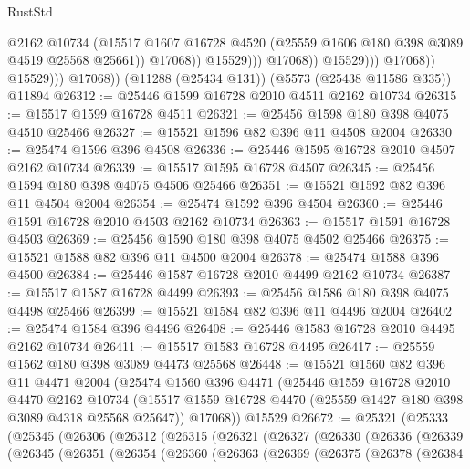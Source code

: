 \begin{lexlean}{RustStd}
\begin{coremodule}
                                      @2162
                                      @10734
                                      (@15517
                                        @1607
                                        @16728
                                        @4520
                                        (@25559 @1606 @180 @398 @3089 @4519 @25568 @25661))
                                      @17068))
                                  @15529)))
                            @17068))
                        @15529)))
                  @17068))
              @15529)))
        @17068))
    (@11288 (@25434 @131))
    (@5573 (@25438 @11586 @335))
    @11894
@26312 := @25446 @1599 @16728 @2010 @4511 @2162 @10734
@26315 := @15517 @1599 @16728 @4511
@26321 := @25456 @1598 @180 @398 @4075 @4510 @25466
@26327 := @15521 @1596 @82 @396 @11 @4508 @2004
@26330 := @25474 @1596 @396 @4508
@26336 := @25446 @1595 @16728 @2010 @4507 @2162 @10734
@26339 := @15517 @1595 @16728 @4507
@26345 := @25456 @1594 @180 @398 @4075 @4506 @25466
@26351 := @15521 @1592 @82 @396 @11 @4504 @2004
@26354 := @25474 @1592 @396 @4504
@26360 := @25446 @1591 @16728 @2010 @4503 @2162 @10734
@26363 := @15517 @1591 @16728 @4503
@26369 := @25456 @1590 @180 @398 @4075 @4502 @25466
@26375 := @15521 @1588 @82 @396 @11 @4500 @2004
@26378 := @25474 @1588 @396 @4500
@26384 := @25446 @1587 @16728 @2010 @4499 @2162 @10734
@26387 := @15517 @1587 @16728 @4499
@26393 := @25456 @1586 @180 @398 @4075 @4498 @25466
@26399 := @15521 @1584 @82 @396 @11 @4496 @2004
@26402 := @25474 @1584 @396 @4496
@26408 := @25446 @1583 @16728 @2010 @4495 @2162 @10734
@26411 := @15517 @1583 @16728 @4495
@26417 := @25559 @1562 @180 @398 @3089 @4473 @25568
@26448 := @15521
    @1560
    @82
    @396
    @11
    @4471
    @2004
    (@25474
      @1560
      @396
      @4471
      (@25446
        @1559
        @16728
        @2010
        @4470
        @2162
        @10734
        (@15517 @1559 @16728 @4470 (@25559 @1427 @180 @398 @3089 @4318 @25568 @25647))
        @17068))
    @15529
@26672 := @25321
    (@25333
      (@25345
        (@26306
          (@26312
            (@26315
              (@26321
                (@26327
                  (@26330
                    (@26336
                      (@26339
                        (@26345
                          (@26351
                            (@26354
                              (@26360
                                (@26363
                                  (@26369
                                    (@26375
                                      (@26378
                                        (@26384

\end{coremodule}
\end{lexlean}
